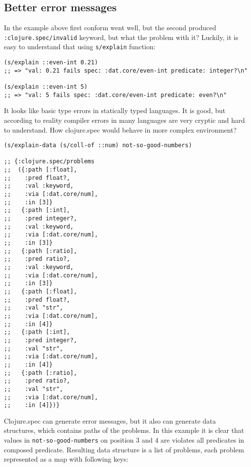 \subsection{Better error messages}
\label{sec:bettererrormessages}
In the example above first conform went well, but the second produced
\texttt{:clojure.spec/invalid} keyword, but what the problem with it? Luckily,
it is easy to understand that using \texttt{s/explain} function:

\begin{verbatim}
(s/explain ::even-int 0.21)
;; => "val: 0.21 fails spec: :dat.core/even-int predicate: integer?\n"

(s/explain ::even-int 5)
;; => "val: 5 fails spec: :dat.core/even-int predicate: even?\n"
\end{verbatim}

It looks like basic type errors in statically typed languages. It is good, but
according to reality compiler errors in many languages are very cryptic and hard
to understand. How clojure.spec would behave in more complex environment?

\begin{verbatim}
(s/explain-data (s/coll-of ::num) not-so-good-numbers)

;; {:clojure.spec/problems
;;  ({:path [:float],
;;    :pred float?,
;;    :val :keyword,
;;    :via [:dat.core/num],
;;    :in [3]}
;;   {:path [:int],
;;    :pred integer?,
;;    :val :keyword,
;;    :via [:dat.core/num],
;;    :in [3]}
;;   {:path [:ratio],
;;    :pred ratio?,
;;    :val :keyword,
;;    :via [:dat.core/num],
;;    :in [3]}
;;   {:path [:float],
;;    :pred float?,
;;    :val "str",
;;    :via [:dat.core/num],
;;    :in [4]}
;;   {:path [:int],
;;    :pred integer?,
;;    :val "str",
;;    :via [:dat.core/num],
;;    :in [4]}
;;   {:path [:ratio],
;;    :pred ratio?,
;;    :val "str",
;;    :via [:dat.core/num],
;;    :in [4]})}
\end{verbatim}

Clojure.spec can generate error messages, but it also can generate data
structures, which contains paths of the problems. In this example it is clear
that values in \texttt{not-so-good-numbers} on position 3 and 4 are violates all
predicates in composed predicate. Resulting data structure is a list of
problems, each problem represented as a map with following keys:

